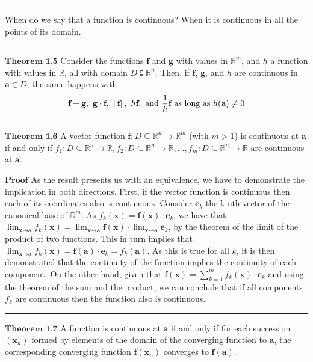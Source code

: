 \documentclass[0pt, a4paper]{article}
\begin{document}
\noindent\rule{\textwidth}{1pt}

When do we say that a function is continuous? When it is continuous in all the points of its domain.

\noindent\rule{\textwidth}{1pt}

$\textbf{Theorem 1.5}$ Consider the functions $\textbf{f}$ and $\textbf{g}$ with values in $\mathbb{R}^m$, and $h$ a function with values in $\mathbb{R}$, all with domain $D\subseteqq\mathbb{R}^n$. Then, if $\textbf{f}$, $\textbf{g}$, and $h$ are continuous in $\textbf{a}\in D$, the same happens with
$$\textbf{f}+\textbf{g},\ \textbf{g}\cdot\textbf{f},\ \norm{\textbf{f}},\ h\textbf{f},\ \text{and }\frac{1}{h}\textbf{f}\text{ as long as }h(\textbf{a})\neq0$$

\noindent\rule{\textwidth}{1pt}

$\textbf{Theorem 1.6}$ A vector function $\textbf{f}:D\subseteq\mathbb{R}^n\to\mathbb{R}^m$ (with $m>1$) is continuous at $\textbf{a}$ if and only if $f_1:D\subseteq\mathbb{R}^n\to\mathbb{R}, f_2:D\subseteq\mathbb{R}^n\to\mathbb{R}, \dots, f_m:D\subseteq\mathbb{R}^n\to\mathbb{R}$ are continuous at $\textbf{a}$.

$\textbf{Proof}$ As the result presents us with an equivalence, we have to demonstrate the implication in both directions. First, if the vector function is continuous then each of its coordinates also is continuous. Consider $\textbf{e}_k$ the k-nth vector of the canonical base of $\mathbb{R}^m$. As $f_k(\textbf{x})=\textbf{f}(\textbf{x})\cdot \textbf{e}_k$, we have that $\lim_{\textbf{x}\to\textbf{a}}f_k(\textbf{x})=\lim_{\textbf{x}\to\textbf{a}}\textbf{f}(\textbf{x})\cdot\lim_{\textbf{x}\to\textbf{a}}\textbf{e}_k$, by the theorem of the limit of the product of two functions. This in turn implies that $\lim_{\textbf{x}\to\textbf{a}}f_k(\textbf{x})=\textbf{f}(\textbf{a})\cdot\textbf{e}_k=f_k(\textbf{a})$. As this is true for all $k$, it is then demonstrated that the continuity of the function implies the continuity of each component. On the other hand, given that $\textbf{f}(\textbf{x})=\sum_{k=1}^{m}f_k(\textbf{x})\cdot\textbf{e}_k$ and using the theorem of the sum and the product, we can conclude that if all components $f_k$ are continuous then the function also is continuous.

\noindent\rule{\textwidth}{1pt}

$\textbf{Theorem 1.7}$ A function is continuous at $\textbf{a}$ if and only if for each succession $(\textbf{x}_n)$ formed by elements of the domain of the converging function to $\textbf{a}$, the corresponding converging function $\textbf{f}(\textbf{x}_n)$ converges to $\textbf{f}(\textbf{a})$.
\end{document}
